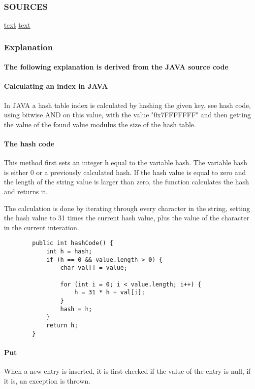 \documentclass[titlepage]{article}
\begin{document}
	\subsubsection{SOURCES}
	\href{ http://grepcode.com/file/repository.grepcode.com/java/root/jdk/openjdk/6-b14/java/util/Hashtable.java}{text}
	\href{http://en.wikipedia.org/wiki/Hash_table#Key_statistics}{text}
	\subsubsection{Explanation}
	\paragraph{The following explanation is derived from the JAVA source code }
	\paragraph{Calculating an index in JAVA}
	In JAVA a hash table index is calculated by hashing the given key, see hash code, using bitwise AND on this value, with the value "0x7FFFFFFF" and then getting the value of the found value modulus the size of the hash table. 
	
	\paragraph{The hash code }
	
This method first sets an integer h equal to the variable hash. The variable hash is either 0 or a previously calculated hash. If the hash value is equal to zero and the length of the string value is larger than zero, the function calculates the hash and returns it. 

The calculation is done by iterating through every character in the string, setting the hash value to 31 times the current hash value, plus the value of the character in the current interation. 
	    \lstset{language=Java}
	    \begin{lstlisting}
	    public int hashCode() {
	    	int h = hash;
	    	if (h == 0 && value.length > 0) {
	    		char val[] = value;
	    		
	    		for (int i = 0; i < value.length; i++) {
	    			h = 31 * h + val[i];
	    		}
	    		hash = h;
	    	}
	    	return h;
	    }
		    \end{lstlisting}
	\paragraph{Put}
	When a new entry is inserted, it is first checked if the value of the entry is null, if it is, an exception is thrown. 
	
\end{document}
